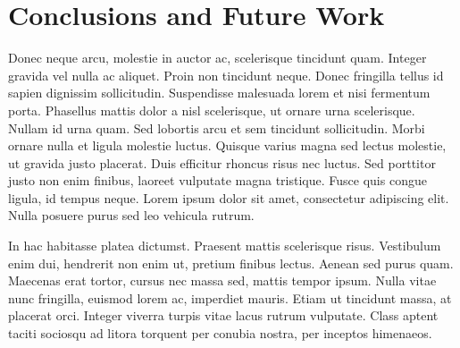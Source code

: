 \documentclass[11pt, onecolumn]{article}
\begin{document}
\section{Conclusions and Future Work}
Donec neque arcu, molestie in auctor ac, scelerisque tincidunt quam. Integer gravida vel nulla ac aliquet. Proin non tincidunt neque. Donec fringilla tellus id sapien dignissim sollicitudin. Suspendisse malesuada lorem et nisi fermentum porta. Phasellus mattis dolor a nisl scelerisque, ut ornare urna scelerisque. Nullam id urna quam. Sed lobortis arcu et sem tincidunt sollicitudin. Morbi ornare nulla et ligula molestie luctus. Quisque varius magna sed lectus molestie, ut gravida justo placerat. Duis efficitur rhoncus risus nec luctus. Sed porttitor justo non enim finibus, laoreet vulputate magna tristique. Fusce quis congue ligula, id tempus neque. Lorem ipsum dolor sit amet, consectetur adipiscing elit. Nulla posuere purus sed leo vehicula rutrum.

In hac habitasse platea dictumst. Praesent mattis scelerisque risus. Vestibulum enim dui, hendrerit non enim ut, pretium finibus lectus. Aenean sed purus quam. Maecenas erat tortor, cursus nec massa sed, mattis tempor ipsum. Nulla vitae nunc fringilla, euismod lorem ac, imperdiet mauris. Etiam ut tincidunt massa, at placerat orci. Integer viverra turpis vitae lacus rutrum vulputate. Class aptent taciti sociosqu ad litora torquent per conubia nostra, per inceptos himenaeos.
\end{document}

